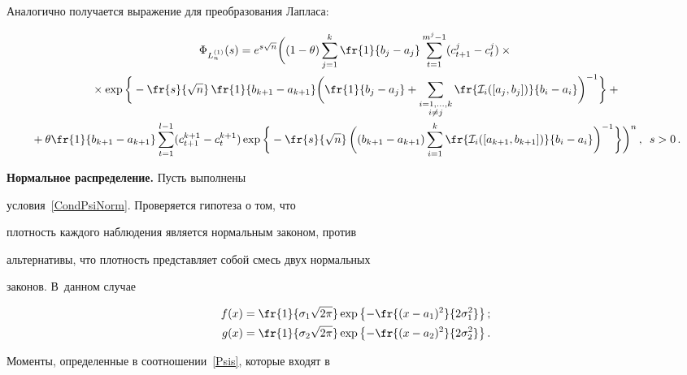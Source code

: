 Аналогично получается выражение для преобразования Лапласа:

\begin{multline*}

\Phi_{L_n^{(1)}}

(s)=e^{s\sqrt{n}}\bigg((1-\theta)\sum\limits_{j=1}^k\fr{1}{b_j-a_j}

\sum\limits_{t=1}^{m^j-1}(c_{t+1}^j-c_t^j)\times{}\\

{}\times\exp{\bigg\{-\fr{s}{\sqrt n}\,\fr{1}{b_{k+1}-a_{k+1}}

\bigg(\fr{1}{b_j-a_j}+\sum_{\substack{i=1,\ldots,k\\i\neq

j}}\fr{\Id_i([a_j,b_j])}{b_i-a_i}\bigg)^{-1}\bigg\}}+{}\\

{}+\theta\fr{1}{b_{k+1}-a_{k+1}}

\sum\limits_{t=1}^{l-1}(c_{t+1}^{k+1}-c_t^{k+1})\exp{\bigg\{-\fr

{s}{\sqrt n}

\,\bigg({(b_{k+1}-a_{k+1})\sum\limits_{i=1}^k\fr{\Id_i([a_{k+1},b_{k+1}])}

{b_i-a_i}}\bigg)^{-1}\bigg\}}\bigg)^{n}\,,\enskip

s>0\notag\,.

\end{multline*}



\textbf{Нормальное распределение.} Пусть выполнены

условия~\eqref{CondPsiNorm}. Проверяется гипотеза о том, что

плотность каждого наблюдения является нормальным законом, против

альтернативы, что плотность представляет собой смесь двух нормальных

законов. В~данном случае



\noindent

\begin{align*}

f(x)&=\fr{1}{\sigma_1\sqrt{2\pi}}\exp{\left\{-\fr{(x-a_1)^2}{2\sigma_1^2}\right\}}\,;\\

g(x)&=\fr{1}{\sigma_2\sqrt{2\pi}}\exp{\left\{-\fr{(x-a_2)^2}{2\sigma_2^2}\right\}}\,.

\end{align*}

Моменты, определенные в соотношении~\eqref{Psis}, которые входят в

